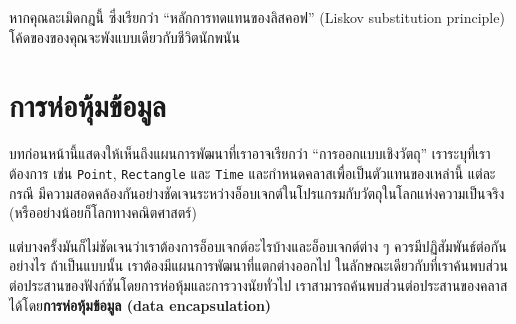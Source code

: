 
หากคุณละเมิดกฎนี้ ซึ่งเรียกว่า ``หลักการทดแทนของลิสคอฟ'' (Liskov substitution principle) โค้ดของของคุณจะพังแบบเดียวกับชีวิตนักพนัน


\section{การห่อหุ้มข้อมูล} %

บทก่อนหน้านี้แสดงให้เห็นถึงแผนการพัฒนาที่เราอาจเรียกว่า ``การออกแบบเชิงวัตถุ'' 
เราระบุที่เราต้องการ  เช่น {\tt Point}, {\tt Rectangle} และ {\tt Time}
และกำหนดคลาสเพื่อเป็นตัวแทนของเหล่านี้ 
แต่ละกรณี มีความสอดคล้องกันอย่างชัดเจนระหว่างอ็อบเจกต์ในโปรแกรมกับวัตถุในโลกแห่งความเป็นจริง (หรืออย่างน้อยก็โลกทางคณิตศาสตร์)



แต่บางครั้งมันก็ไม่ชัดเจนว่าเราต้องการอ็อบเจกต์อะไรบ้างและอ็อบเจกต์ต่าง ๆ ควรมีปฏิสัมพันธ์ต่อกันอย่างไร 
ถ้าเป็นแบบนั้น เราต้องมีแผนการพัฒนาที่แตกต่างออกไป 
ในลักษณะเดียวกับที่เราค้นพบส่วนต่อประสานของฟังก์ชันโดยการห่อหุ้มและการวางนัยทั่วไป เราสามารถค้นพบส่วนต่อประสานของคลาสได้โดย{\bf การห่อหุ้มข้อมูล (data encapsulation)}


